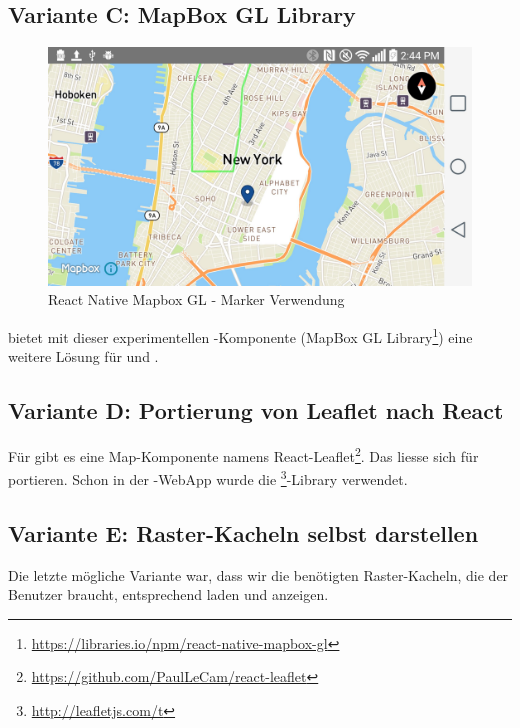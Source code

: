 \subsection{Variante C: MapBox GL Library}

\begin{figure}[H]
	\centering
	\includegraphics[width=\textwidth]{images/technischer_bericht/react-native-mapbox-gl.jpg}
	\caption{React Native Mapbox GL - Marker Verwendung}
	\label{image-variante-b-map}
\end{figure}

 bietet mit dieser experimentellen -Komponente (MapBox GL Library\footnote{\url{https://libraries.io/npm/react-native-mapbox-gl}}) eine weitere Lösung für  und .


\subsection{Variante D: Portierung von Leaflet nach React}

Für  gibt es eine Map-Komponente namens React-Leaflet\footnote{\url{https://github.com/PaulLeCam/react-leaflet}}. 
Das liesse sich für  portieren.
Schon in der \kort{}-\gls{WebApp} wurde die \footnote{\url{http://leafletjs.com/t}}-Library verwendet.

\subsection{Variante E: Raster-Kacheln selbst darstellen}

Die letzte mögliche Variante war, dass wir die benötigten Raster-Kacheln, die der Benutzer braucht, entsprechend laden und anzeigen.

